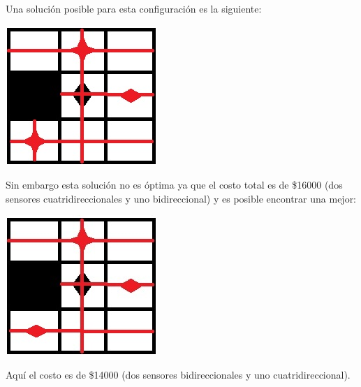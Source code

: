 Una solución posible para esta configuración es la siguiente:

\includegraphics[scale=0.6]{ej3/imgs/solValidaPeroNoOptima.png}

Sin embargo esta solución no es óptima ya que el costo total es de \$16000 (dos sensores cuatridireccionales y uno bidireccional) y es posible encontrar una mejor:

\includegraphics[scale=0.6]{ej3/imgs/solOptima.png}

Aquí el costo es de \$14000 (dos sensores bidireccionales y uno cuatridireccional).


